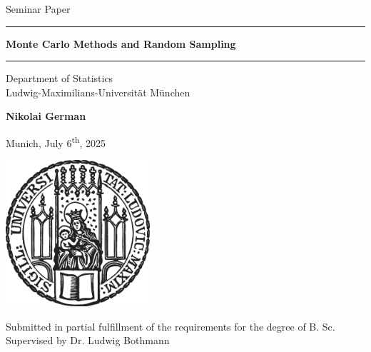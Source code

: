 \documentclass[12pt]{article}
\newcommand{\mytitle}{Monte Carlo Methods and Random Sampling}
\newcommand{\myname}{Nikolai German}
\newcommand{\mysupervisor}{Dr. Ludwig Bothmann}
\theoremstyle{definition}
\begin{document}
 
\begin{titlepage}
\begin{center}
    
\LARGE
Seminar Paper
    
\vspace{0.5cm}
      
\rule{\textwidth}{1.5pt}
\LARGE
\textbf{\mytitle}
\rule{\textwidth}{1.5pt}
   
\vspace{0.5cm}
      
\large
Department of Statistics \\
Ludwig-Maximilians-Universität München 

\vfill

\Large
\textbf{\myname}

\vfill

\large
Munich, July 6\textsuperscript{th}, 2025
      
\vfill

\includegraphics[width = 0.4\textwidth]{sigillum.png}

\vfill

\normalsize
Submitted in partial fulfillment of the requirements for the degree of B. Sc.
\\

Supervised by \mysupervisor

\end{center}
\end{titlepage}


\newpage
\end{document}
